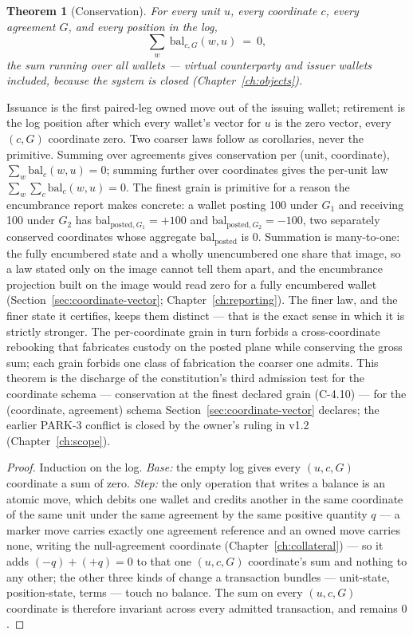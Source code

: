 \documentclass[11pt,a4paper]{article}
\newtheorem{theorem}[definition]{Theorem}
\begin{document}
\begin{theorem}[Conservation]\label{thm:conservation}
For every unit $u$, every coordinate $c$, every agreement $G$, and every position in the
log,
\[
\sum_{w}\ \mathrm{bal}_{c,G}(w,u)\ =\ 0,
\]
the sum running over all wallets --- virtual counterparty and issuer wallets
included, because the system is closed (Chapter~\ref{ch:objects}).
\end{theorem}

Issuance is the first paired-leg owned move out of the issuing wallet; retirement is the
log position after which every wallet's vector for $u$ is the zero vector, every $(c,G)$
coordinate zero. Two coarser laws follow as corollaries, never the primitive. Summing over
agreements gives conservation per (unit, coordinate), $\sum_w \mathrm{bal}_c(w,u)=0$;
summing further over coordinates gives the per-unit law $\sum_w\sum_c \mathrm{bal}_c(w,u)=0$.
The finest grain is primitive for a reason the encumbrance report makes concrete: a wallet
posting 100 under $G_1$ and receiving 100 under $G_2$ has
$\mathrm{bal}_{\text{posted},G_1}=+100$ and $\mathrm{bal}_{\text{posted},G_2}=-100$, two
separately conserved coordinates whose aggregate $\mathrm{bal}_{\text{posted}}$ is $0$.
Summation is many-to-one: the fully encumbered state and a wholly unencumbered one share
that image, so a law stated only on the image cannot tell them apart, and the encumbrance
projection built on the image would read zero for a fully encumbered wallet
(Section~\ref{sec:coordinate-vector}; Chapter~\ref{ch:reporting}). The finer law,
and the finer state it certifies, keeps them distinct --- that is the exact sense in which
it is strictly stronger. The per-coordinate grain in turn forbids a cross-coordinate
rebooking that fabricates custody on the posted plane while conserving the gross sum; each
grain forbids one class of fabrication the coarser one admits. This theorem is the
discharge of the constitution's third admission test for the coordinate schema ---
conservation at the finest declared grain (C-4.10) --- for the (coordinate, agreement)
schema Section~\ref{sec:coordinate-vector} declares; the earlier PARK-3 conflict is
closed by the owner's ruling in v1.2 (Chapter~\ref{ch:scope}).

\begin{proof}
Induction on the log. \emph{Base:} the empty log gives every $(u,c,G)$ coordinate a sum of
zero. \emph{Step:} the only operation that writes a balance is an atomic move, which debits
one wallet and credits another in the same coordinate of the same unit under the same
agreement by the same positive quantity $q$ --- a marker move carries exactly one agreement
reference and an owned move carries none, writing the null-agreement coordinate
(Chapter~\ref{ch:collateral}) --- so it adds $(-q)+(+q)=0$ to that one $(u,c,G)$ coordinate's
sum and nothing to any other; the other three kinds of change a transaction bundles ---
unit-state, position-state, terms --- touch no balance. The sum on every $(u,c,G)$
coordinate is therefore invariant across every admitted transaction, and remains $0$.
\end{proof}
\end{document}

